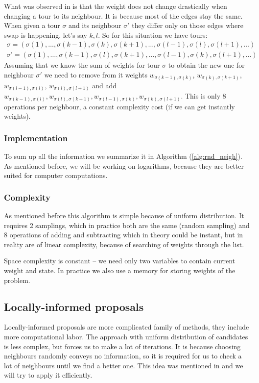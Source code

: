 		What was observed in \cite{decryption_tsp_MCMC} is that the weight does not change drastically when changing a tour to its neighbour. It is because most of the edges stay the same. When given a tour $\sigma$ and its neighbour $\sigma'$ they differ only on those edges where swap is happening, let's say $k,l$. So for this situation we have tours:
		\begin{align*}
			\sigma = (\sigma(1), \ldots, \sigma(k-1), \sigma(k), \sigma(k+1), \ldots, \sigma(l-1), \sigma(l), \sigma(l+1), \ldots) \\
			\sigma' = (\sigma(1), \ldots, \sigma(k-1), \sigma(l), \sigma(k+1), \ldots, \sigma(l-1), \sigma(k), \sigma(l+1), \ldots)
		\end{align*}
		Assuming that we know the sum of weights for tour $\sigma$ to obtain the new one for neighbour $\sigma'$ we need to remove from it weights $w_{\sigma(k-1), \sigma(k)}$, $w_{\sigma(k), \sigma(k+1)}$, $w_{\sigma(l-1), \sigma(l)}$, $w_{\sigma(l), \sigma(l+1)}$ and add $w_{\sigma(k-1), \sigma(l)}, w_{\sigma(l), \sigma(k+1)}, w_{\sigma(l-1), \sigma(k)}, w_{\sigma(k), \sigma(l+1)}$. This is only $8$ operations per neighbour, a constant complexity cost (if we can get instantly weights).
		
	\subsubsection{Implementation}
		To sum up all the information we summarize it in Algorithm (\ref{alg:rnd_neigh}). As mentioned before, we will be working on logarithms, because they are better suited for computer computations.
		
		
		
	\subsubsection{Complexity}
		As mentioned before this algorithm is simple because of uniform distribution. It requires 2 samplings, which in practice both are the same (random sampling) and 8 operations of adding and subtracting which in theory could be instant, but in reality are of linear complexity, because of searching of weights through the list.
		
		Space complexity is constant -- we need only two variables to contain current weight and state. In practice we also use a memory for storing weights of the problem.
		\clearpage
		
\subsection{Locally-informed proposals}
	Locally-informed proposals are more complicated family of methods, they include more computational labor. The approach with uniform distribution of candidates is less complex, but forces us to make a lot of iterations. It is because choosing neighbours randomly conveys no information, so it is required for us to check a lot of neighbours until we find a better one. This idea was mentioned in \cite{maddison2021oops} and we will try to apply it efficiently.
	
